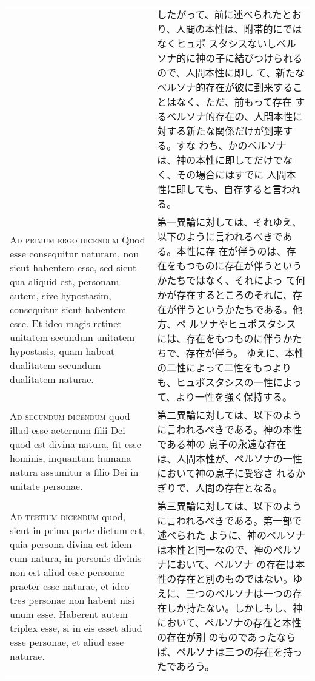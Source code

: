 \documentclass[10pt]{jsarticle} %
\begin{document}
\begin{longtable}{p{21em}p{21em}}
&

したがって、前に述べられたとおり、人間の本性は、附帯的にではなくヒュポ
 スタシスないしペルソナ的に神の子に結びつけられるので、人間本性に即し
 て、新たなペルソナ的存在が彼に到来することはなく、ただ、前もって存在
 するペルソナ的存在の、人間本性に対する新たな関係だけが到来する。すな
 わち、かのペルソナは、神の本性に即してだけでなく、その場合にはすでに
 人間本性に即しても、自存すると言われる。


\\



{\scshape Ad primum ergo dicendum} Quod esse consequitur naturam, non
sicut habentem esse, sed sicut qua aliquid est, personam autem, sive
hypostasim, consequitur sicut habentem esse. Et ideo magis retinet
unitatem secundum unitatem hypostasis, quam habeat dualitatem secundum
dualitatem naturae.


&

第一異論に対しては、それゆえ、以下のように言われるべきである。本性に存
在が伴うのは、存在をもつものに存在が伴うというかたちではなく、それによっ
て何かが存在するところのそれに、存在が伴うというかたちである。他方、ペ
ルソナやヒュポスタシスには、存在をもつものに伴うかたちで、存在が伴う。
ゆえに、本性の二性によって二性をもつよりも、ヒュポスタシスの一性によっ
て、より一性を強く保持する。

\\



{\scshape Ad secundum dicendum} quod illud esse aeternum filii Dei
quod est divina natura, fit esse hominis, inquantum humana natura
assumitur a filio Dei in unitate personae.


&

第二異論に対しては、以下のように言われるべきである。神の本性である神の
息子の永遠な存在は、人間本性が、ペルソナの一性において神の息子に受容さ
れるかぎりで、人間の存在となる。


\\



{\scshape Ad tertium dicendum} quod, sicut in prima parte dictum est,
quia persona divina est idem cum natura, in personis divinis non est
aliud esse personae praeter esse naturae, et ideo tres personae non
habent nisi unum esse. Haberent autem triplex esse, si in eis esset
aliud esse personae, et aliud esse naturae.


&

第三異論に対しては、以下のように言われるべきである。第一部で述べられた
ように、神のペルソナは本性と同一なので、神のペルソナにおいて、ペルソナ
の存在は本性の存在と別のものではない。ゆえに、三つのペルソナは一つの存
在しか持たない。しかしもし、神において、ペルソナの存在と本性の存在が別
のものであったならば、ペルソナは三つの存在を持ったであろう。


\end{longtable}
\end{document}
